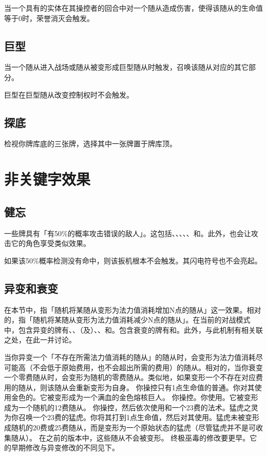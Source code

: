 当一个具有的实体在其操控者的回合中对一个随从造成伤害，使得该随从的生命值等于0时，荣誉消灭会触发。

\subsection{巨型}
\label{colossal}

当一个随从进入战场或随从被变形成巨型随从时触发，召唤该随从对应的其它部分。

巨型在巨型随从改变控制权时不会触发。

\subsection{探底}
\label{dredge}

检视你牌库底的三张牌，选择其中一张牌置于牌库顶。

\section{非关键字效果}

\subsection{健忘}
\label{forgetful}

一些牌具有「有50\%的概率攻击错误的敌人」。这包括、、、、、和。此外，也会让攻击它的角色享受类似效果。

如果该50\%概率检测没有命中，则该扳机根本不会触发。其闪电符号也不会亮起。

\subsection{异变和衰变}
\label{evolve-and-devolve}

在本节中，指「随机将某随从变形为法力值消耗增加N点的随从」这一效果。相对的，指「随机将某随从变形为法力值消耗减少N点的随从」。在当前的对战模式中，包含异变的牌有、、（及）、、和。包含衰变的牌有和。此外，与此机制有相关联之处，在此一并讨论。

 当你异变一个「不存在所需法力值消耗的随从」的随从时，会变形为法力值消耗尽可能高（不会低于原始费用，也不会超出所需的费用）的随从。相对的，当你衰变一个零费随从时，会变形为随机的零费随从。类似地，如果变形一个不存在对应费用的随从，则该随从会重新变形为自身。
\example 你操控只有1点生命值的普通。你对其使用金色的。它被变形成为一个满血的金色熔核巨人。
\example 你操控。你使用。它被变形成为一个随机的12费随从。
\example 你操控，然后依次使用和一个23费的法术。猛虎之灵为你召唤一个23费的猛虎。你将其打到1点生命值，然后对其使用。猛虎未被变形成随机的20费或25费随从，而是变形为一个原始状态的猛虎（尽管猛虎并不是可收集随从）。
\notice 在之前的版本中，这些随从不会被变形。
\notice 终极巫毒的修改要更早。它的早期修改与异变修改的不同见下。

